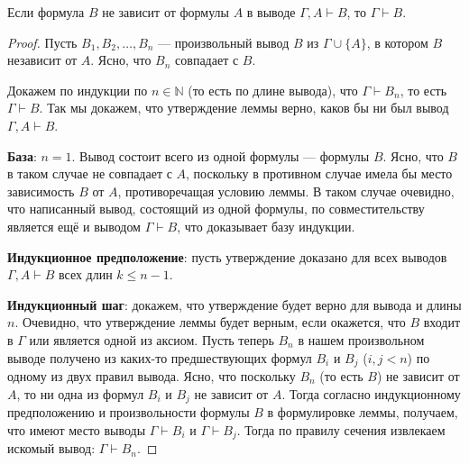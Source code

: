 \begin{lemma}\label{th:independent_formulas}
    Если формула $B$ не зависит от формулы $A$ в выводе $\Gamma, A \vdash B$, то $\Gamma \vdash B$.
\end{lemma}
\begin{proof}
    Пусть $B_1, B_2, \dots, B_n$ --- произвольный вывод $B$ из $\Gamma \cup \{A\}$, в котором $B$ независит от $A$. Ясно, что $B_n$ совпадает с $B$.

    Докажем по индукции по $n \in \mathbb{N}$ (то есть по длине вывода), что $\Gamma \vdash B_n$, то есть $\Gamma \vdash B$. Так мы докажем, что утверждение леммы верно, каков бы ни был вывод $\Gamma, A \vdash B$.

    \textbf{База}: $n = 1$. Вывод состоит всего из одной формулы --- формулы $B$. Ясно, что $B$ в таком случае не совпадает с $A$, поскольку в противном случае имела бы место зависимость $B$ от $A$, противоречащая условию леммы. В таком случае очевидно, что написанный вывод, состоящий из одной формулы, по совместительству является ещё и выводом $\Gamma \vdash B$, что доказывает базу индукции.

    \textbf{Индукционное предположение}: пусть утверждение доказано для всех выводов $\Gamma, A \vdash B$ всех длин $k \leqslant n - 1$.

    \textbf{Индукционный шаг}: докажем, что утверждение будет верно для вывода и длины $n$. Очевидно, что утверждение леммы будет верным, если окажется, что $B$ входит в $\Gamma$ или является одной из аксиом. Пусть теперь $B_n$ в нашем произвольном выводе получено из каких-то предшествующих формул $B_i$ и $B_j$ ($i, j < n$) по одному из двух правил вывода. Ясно, что поскольку $B_n$ (то есть $B$) не зависит от $A$, то ни одна из формул $B_i$ и $B_j$ не зависит от $A$. Тогда согласно индукционному предположению и произвольности формулы $B$ в формулировке леммы, получаем, что имеют место выводы $\Gamma \vdash B_i$ и $\Gamma \vdash B_j$. Тогда по правилу сечения извлекаем искомый вывод: $\Gamma \vdash B_n$.
\end{proof}


